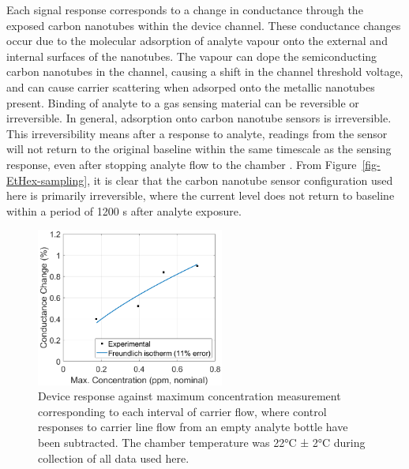 \documentclass[
  a4paper,
]{scrbook}
\begin{document}
Each signal response corresponds to a change in conductance through the
exposed carbon nanotubes within the device channel. These conductance
changes occur due to the molecular adsorption of analyte vapour onto the
external and internal surfaces of the nanotubes. The vapour can dope the
semiconducting carbon nanotubes in the channel, causing a shift in the
channel threshold voltage, and can cause carrier scattering when
adsorped onto the metallic nanotubes present. Binding of analyte to a
gas sensing material can be reversible or irreversible. In general,
adsorption onto carbon nanotube sensors is irreversible. This
irreversibility means after a response to analyte, readings from the
sensor will not return to the original baseline within the same
timescale as the sensing response, even after stopping analyte flow to
the chamber \autocite{Agnihotri2005,Lee2005}. From
Figure~\ref{fig-EtHex-sampling}, it is clear that the carbon nanotube
sensor configuration used here is primarily irreversible, where the
current level does not return to baseline within a period of 1200 s
after analyte exposure.

\begin{figure}

{\centering \includegraphics[width=0.55\textwidth,height=\textheight]{figures/ch6/EtHex-ratio-comparison.png}

}

\caption{\label{fig-EtHex-ratio-comparison}Device response against
maximum concentration measurement corresponding to each interval of
carrier flow, where control responses to carrier line flow from an empty
analyte bottle have been subtracted. The chamber temperature was 22°C ±
2°C during collection of all data used here.}

\end{figure}
\end{document}
